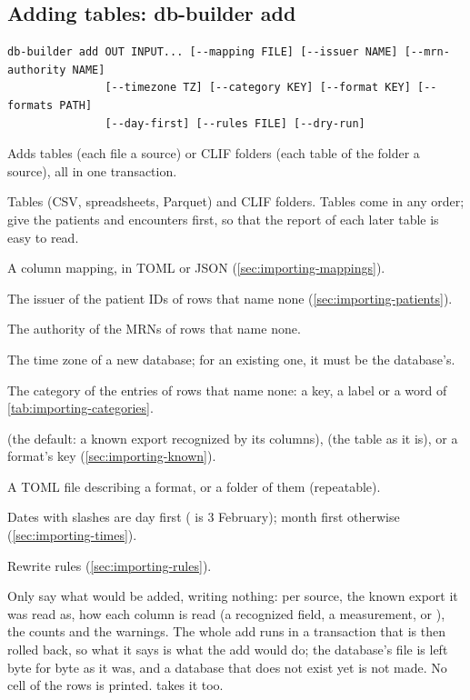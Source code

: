 \subsection{Adding tables: db-builder add}
\label{sec:importing-cli}

\begin{lstlisting}[style=signature]
db-builder add OUT INPUT... [--mapping FILE] [--issuer NAME] [--mrn-authority NAME]
               [--timezone TZ] [--category KEY] [--format KEY] [--formats PATH]
               [--day-first] [--rules FILE] [--dry-run]
\end{lstlisting}
Adds tables (each file a source) or CLIF folders (each table of the folder a source), all in one
transaction.
\begin{params}
\item[INPUT...] Tables (CSV, spreadsheets, Parquet) and CLIF folders. Tables come in any order;
  give the patients and encounters first, so that the report of each later table is easy to read.
\item[--mapping FILE] A column mapping, in TOML or JSON (\cref{sec:importing-mappings}).
\item[--issuer NAME] The issuer of the patient IDs of rows that name none
  (\cref{sec:importing-patients}).
\item[--mrn-authority NAME] The authority of the MRNs of rows that name none.
\item[--timezone TZ] The time zone of a new database; for an existing one, it must be the
  database's.
\item[--category KEY] The category of the entries of rows that name none: a key, a label or a
  word of \cref{tab:importing-categories}.
\item[--format KEY]  (the default: a known export recognized by its columns),
   (the table as it is), or a format's key (\cref{sec:importing-known}).
\item[--formats PATH] A TOML file describing a format, or a folder of them (repeatable).
\item[--day-first] Dates with slashes are day first ( is 3 February); month
  first otherwise (\cref{sec:importing-times}).
\item[--rules FILE] Rewrite rules (\cref{sec:importing-rules}).
\item[--dry-run] Only say what would be added, writing nothing: per source, the known export it
  was read as, how each column is read (a recognized field, a measurement, or ),
  the counts and the warnings. The whole add runs in a transaction that is then rolled back, so
  what it says is what the add would do; the database's file is left byte for byte as it was,
  and a database that does not exist yet is not made. No cell of the rows is printed.
   takes it too.
\end{params}
